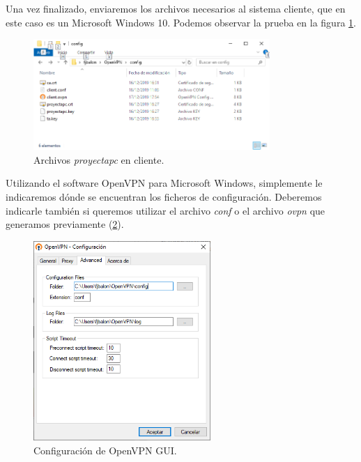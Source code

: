 \documentclass[a4paper, 11pt, titlepage]{article}
\begin{document}
        Una vez finalizado, enviaremos los archivos necesarios al sistema cliente, que en este caso
        es un Microsoft Windows 10. Podemos observar la prueba en la figura \ref{fig:windows08}.

        \begin{figure}[htp]
            \centering
            \includegraphics[width=0.8\textwidth]{resources/windows08.png}
            \caption{Archivos \textit{proyectapc} en cliente.}
            \label{fig:windows08}
        \end{figure}  

        Utilizando el software OpenVPN para Microsoft Windows, simplemente le indicaremos dónde
        se encuentran los ficheros de configuración. Deberemos indicarle también si queremos 
        utilizar el archivo \textit{conf} o el archivo \textit{ovpn} que generamos previamente
        (\ref{fig:windows09}).

        \begin{figure}[htp]
            \centering
            \includegraphics[width=0.6\textwidth]{resources/windows09.png}
            \caption{Configuración de OpenVPN GUI.}
            \label{fig:windows09}
        \end{figure}  
\end{document}
